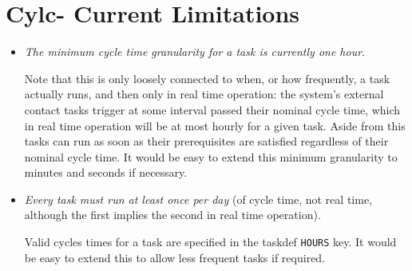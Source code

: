 \documentclass[11pt,a4paper]{article}
\begin{document}
\section{Cylc- Current Limitations}

\begin{itemize}

        \item {\em The minimum cycle time granularity for a task is currently one hour}.

Note that this is only loosely connected to when, or how frequently, a
task actually runs, and then only in real time operation: the system's
external contact tasks trigger at some interval passed their nominal
cycle time, which in real time operation will be at most hourly for a
given task. Aside from this tasks can run as soon as their prerequisites
are satisfied regardless of their nominal cycle time. It would be easy
to extend this minimum granularity to minutes and seconds if necessary.  

    \item {\em Every task must run at least once per day} (of cycle
        time, not real time, although the first implies the second in
        real time operation). 

Valid cycles times for a task are specified in the taskdef
\lstinline=HOURS= key.  It would be easy to extend this to allow less
frequent tasks if required. 

\end{itemize}

%

%
\end{document}

